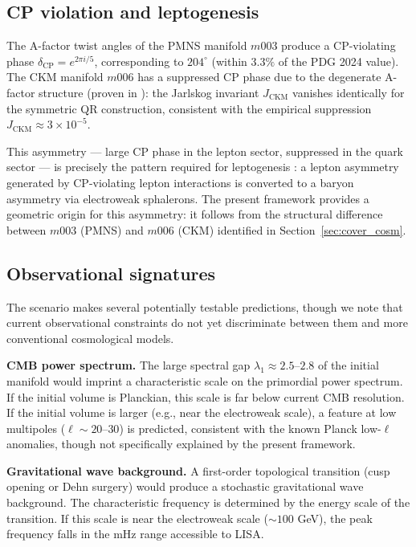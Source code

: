\documentclass[12pt]{article}
\theoremstyle{definition}
\begin{document}
\subsection{CP violation and leptogenesis}

The A-factor twist angles of the PMNS manifold $m003$ produce a
CP-violating phase $\delta_\mathrm{CP} = e^{2\pi i/5}$, corresponding
to $204^\circ$ (within $3.3\%$ of the PDG 2024 value). The CKM
manifold $m006$ has a suppressed CP phase due to the degenerate
A-factor structure (proven in \cite{Gentry:CP}): the Jarlskog
invariant $J_\mathrm{CKM}$ vanishes identically for the symmetric QR
construction, consistent with the empirical suppression
$J_\mathrm{CKM} \approx 3 \times 10^{-5}$.

This asymmetry --- large CP phase in the lepton sector, suppressed in
the quark sector --- is precisely the pattern required for
leptogenesis \cite{leptogenesis}: a lepton asymmetry generated by
CP-violating lepton interactions is converted to a baryon asymmetry
via electroweak sphalerons. The present framework provides a
geometric origin for this asymmetry: it follows from the structural
difference between $m003$ (PMNS) and $m006$ (CKM) identified in
Section~\ref{sec:cover_cosm}.

\subsection{Observational signatures}

The scenario makes several potentially testable predictions,
though we note that current observational constraints do not yet
discriminate between them and more conventional cosmological models.

\textbf{CMB power spectrum.} The large spectral gap
$\lambda_1 \approx 2.5$--$2.8$ of the initial manifold would
imprint a characteristic scale on the primordial power spectrum.
If the initial volume is Planckian, this scale is far below current
CMB resolution. If the initial volume is larger (e.g., near the
electroweak scale), a feature at low multipoles ($\ell \sim 20$--$30$)
is predicted, consistent with the known Planck low-$\ell$ anomalies,
though not specifically explained by the present framework.

\textbf{Gravitational wave background.} A first-order topological
transition (cusp opening or Dehn surgery) would produce a stochastic
gravitational wave background. The characteristic frequency is
determined by the energy scale of the transition. If this scale is
near the electroweak scale ($\sim 100$ GeV), the peak frequency
falls in the mHz range accessible to LISA.
\end{document}
